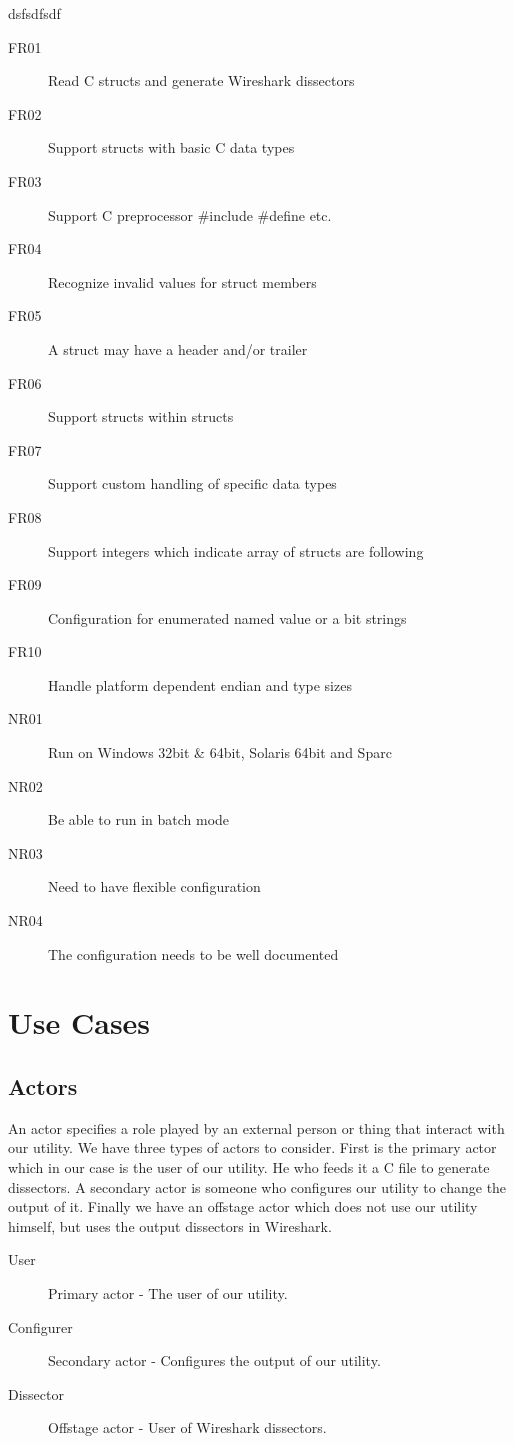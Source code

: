 dsfsdfsdf
\begin{description}
    \item[FR01] Read C structs and generate Wireshark dissectors
	\item[FR02] Support structs with basic C data types
	\item[FR03] Support C preprocessor \#include \#define etc.
	\item[FR04] Recognize invalid values for struct members
	\item[FR05] A struct may have a header and/or trailer
	\item[FR06] Support structs within structs
	\item[FR07] Support custom handling of specific data types
	\item[FR08] Support integers which indicate array of structs are following
	\item[FR09] Configuration for enumerated named value or a bit strings
	\item[FR10] Handle platform dependent endian and type sizes
	\item[NR01] Run on Windows 32bit \& 64bit, Solaris 64bit and Sparc
	\item[NR02] Be able to run in batch mode
	\item[NR03] Need to have flexible configuration
	\item[NR04] The configuration needs to be well documented
\end{description}

\section{Use Cases}
\label{sec:usecases}

\subsection{Actors}
An actor specifies a role played by an external person or thing that interact
with our utility. We have three types of actors to consider. First is the
primary actor which in our case is the user of our utility. He who feeds it a
C file to generate dissectors. A secondary actor is someone who configures our
utility to change the output of it. Finally we have an offstage actor which
does not use our utility himself, but uses the output dissectors in Wireshark.

\begin{description}
	\item[User] Primary actor - The user of our utility.
	\item[Configurer] Secondary actor - Configures the output of our utility.
	\item[Dissector] Offstage actor - User of Wireshark dissectors.
\end{description}

